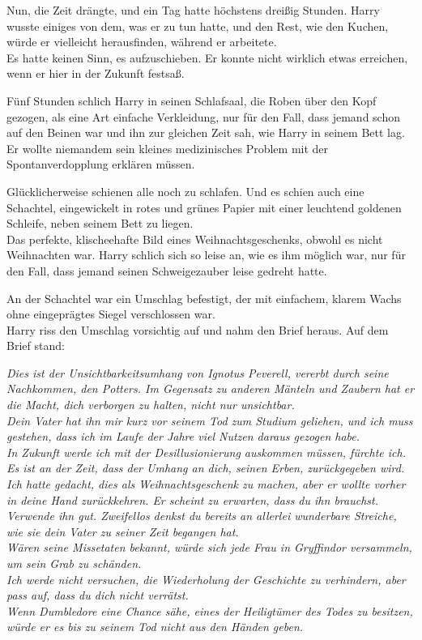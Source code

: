 {Nun, die Zeit drängte, und ein Tag hatte höchstens dreißig Stunden. Harry wusste einiges von dem, was er zu tun hatte, und den Rest, wie den Kuchen, würde er vielleicht herausfinden, während er arbeitete.\\ Es hatte keinen Sinn, es aufzuschieben. Er konnte nicht wirklich etwas erreichen, wenn er hier in der Zukunft festsaß.

Fünf Stunden schlich Harry in seinen Schlafsaal, die Roben über den Kopf gezogen, als eine Art einfache Verkleidung, nur für den Fall, dass jemand schon auf den Beinen war und ihn zur gleichen Zeit sah, wie Harry in seinem Bett lag.\\ Er wollte niemandem sein kleines medizinisches Problem mit der Spontanverdopplung erklären müssen.

Glücklicherweise schienen alle noch zu schlafen. Und es schien auch eine Schachtel, eingewickelt in rotes und grünes Papier mit einer leuchtend goldenen Schleife, neben seinem Bett zu liegen.\\ Das perfekte, klischeehafte Bild eines Weihnachtsgeschenks, obwohl es nicht Weihnachten war. Harry schlich sich so leise an, wie es ihm möglich war, nur für den Fall, dass jemand seinen Schweigezauber leise gedreht hatte.

An der Schachtel war ein Umschlag befestigt, der mit einfachem, klarem Wachs ohne eingeprägtes Siegel verschlossen war.\\ Harry riss den Umschlag vorsichtig auf und nahm den Brief heraus. Auf dem Brief stand:

\emph{Dies ist der Unsichtbarkeitsumhang von Ignotus Peverell, vererbt durch seine Nachkommen, den Potters. Im Gegensatz zu anderen Mänteln und Zaubern hat er die Macht, dich verborgen zu halten, nicht nur unsichtbar.\\ Dein Vater hat ihn mir kurz vor seinem Tod zum Studium geliehen, und ich muss gestehen, dass ich im Laufe der Jahre viel Nutzen daraus gezogen habe.\\ In Zukunft werde ich mit der Desillusionierung auskommen müssen, fürchte ich. Es ist an der Zeit, dass der Umhang an dich, seinen Erben, zurückgegeben wird.}\\ \emph{\hfill\break Ich hatte gedacht, dies als Weihnachtsgeschenk zu machen, aber er wollte vorher in deine Hand zurückkehren. Er scheint zu erwarten, dass du ihn brauchst. Verwende ihn gut. Zweifellos denkst du bereits an allerlei wunderbare Streiche, wie sie dein Vater zu seiner Zeit begangen hat.}\\ \emph{\hfill\break Wären seine Missetaten bekannt, würde sich jede Frau in Gryffindor versammeln, um sein Grab zu schänden.}\\ \emph{\hfill\break Ich werde nicht versuchen, die Wiederholung der Geschichte zu verhindern, aber pass auf, dass du dich nicht verrätst.\\ Wenn Dumbledore eine Chance sähe, eines der Heiligtümer des Todes zu besitzen, würde er es bis zu seinem Tod nicht aus den Händen geben.}\\

}
